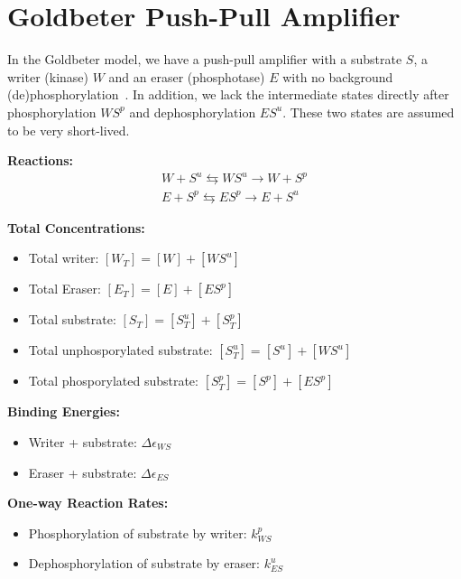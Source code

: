 \documentclass[aps,onecolumn,superscriptaddress,notitlepage]{revtex4-1}
\begin{document}
\section{Goldbeter Push-Pull Amplifier}

In the Goldbeter model, we have a push-pull amplifier with a substrate $S$, a writer (kinase) $W$ and an eraser (phosphotase) $E$ with no background (de)phosphorylation~\cite{Goldbeter1981}. In addition, we lack the intermediate states directly after phosphorylation $WS^p$ and dephosphorylation $ES^u$. These two states are assumed to be very short-lived.

\textbf{Reactions:}
\begin{gather}
W + S^u \leftrightarrows WS^u  \rightarrow W + S^p\\
E + S^p \leftrightarrows ES^p  \rightarrow E + S^u
\end{gather}

\textbf{Total Concentrations:}
\begin{itemize}
\item Total writer: $[W_T] = [W] + [WS^u]$
\item Total Eraser: $[E_T] = [E] + [ES^p]$
\item Total substrate: $[S_T] = [S^u_T] + [S^p_T]$
\item Total unphosporylated substrate: $[S^u_T] = [S^u] + [WS^u]$
\item Total phosporylated substrate: $[S^p_T] = [S^p] + [ES^p]$
\end{itemize}


\textbf{Binding Energies:}
\begin{itemize}
\item Writer + substrate: $\Delta\epsilon_{WS}$
\item Eraser + substrate: $\Delta\epsilon_{ES}$
\end{itemize}

\textbf{One-way Reaction Rates:}
\begin{itemize}
\item Phosphorylation of substrate by writer: $k_{WS}^p$
\item Dephosphorylation of substrate by eraser: $k_{ES}^u$
\end{itemize}
\end{document}
